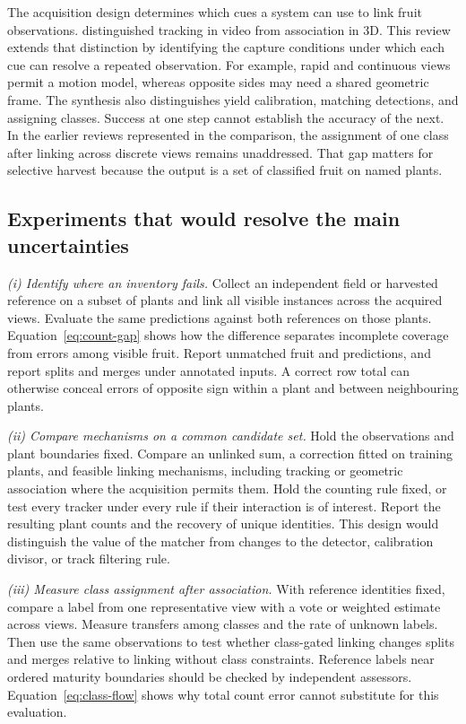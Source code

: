 The acquisition design determines which cues a system can use to link fruit observations. \citet{miranda2023fruit} distinguished tracking in video from association in 3D. This review extends that distinction by identifying the capture conditions under which each cue can resolve a repeated observation. For example, rapid and continuous views permit a motion model, whereas opposite sides may need a shared geometric frame. The synthesis also distinguishes yield calibration, matching detections, and assigning classes. Success at one step cannot establish the accuracy of the next. In the earlier reviews represented in the comparison, the assignment of one class after linking across discrete views remains unaddressed. That gap matters for selective harvest because the output is a set of classified fruit on named plants.

\subsection{Experiments that would resolve the main uncertainties}\label{sec:experiments-review}

\textit{(i) Identify where an inventory fails.} Collect an independent field or harvested reference on a subset of plants and link all visible instances across the acquired views. Evaluate the same predictions against both references on those plants. Equation~\ref{eq:count-gap} shows how the difference separates incomplete coverage from errors among visible fruit. Report unmatched fruit and predictions, and report splits and merges under annotated inputs. A correct row total can otherwise conceal errors of opposite sign within a plant and between neighbouring plants.

\textit{(ii) Compare mechanisms on a common candidate set.} Hold the observations and plant boundaries fixed. Compare an unlinked sum, a correction fitted on training plants, and feasible linking mechanisms, including tracking or geometric association where the acquisition permits them. Hold the counting rule fixed, or test every tracker under every rule if their interaction is of interest. Report the resulting plant counts and the recovery of unique identities. This design would distinguish the value of the matcher from changes to the detector, calibration divisor, or track filtering rule.

\textit{(iii) Measure class assignment after association.} With reference identities fixed, compare a label from one representative view with a vote or weighted estimate across views. Measure transfers among classes and the rate of unknown labels. Then use the same observations to test whether class-gated linking changes splits and merges relative to linking without class constraints. Reference labels near ordered maturity boundaries should be checked by independent assessors. Equation~\ref{eq:class-flow} shows why total count error cannot substitute for this evaluation.

